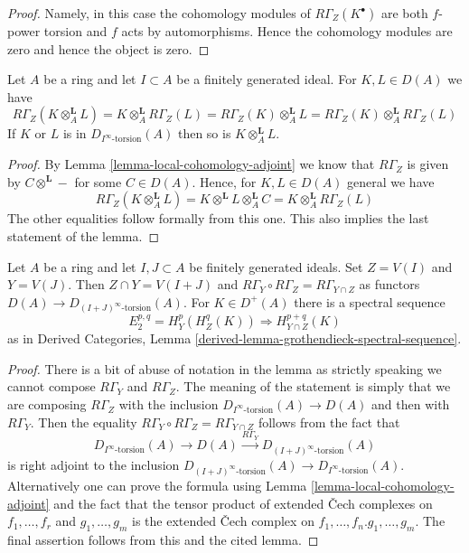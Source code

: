 \begin{proof}
Namely, in this case the cohomology modules of $R\Gamma_Z(K^\bullet)$
are both $f$-power torsion and $f$ acts by automorphisms. Hence the
cohomology modules are zero and hence the object is zero.
\end{proof}

\begin{lemma}
\label{lemma-torsion-tensor-product}
Let $A$ be a ring and let $I \subset A$ be a finitely generated ideal.
For $K, L \in D(A)$ we have
$$
R\Gamma_Z(K \otimes_A^\mathbf{L} L) =
K \otimes_A^\mathbf{L} R\Gamma_Z(L) =
R\Gamma_Z(K) \otimes_A^\mathbf{L} L =
R\Gamma_Z(K) \otimes_A^\mathbf{L} R\Gamma_Z(L)
$$
If $K$ or $L$ is in $D_{I^\infty\text{-torsion}}(A)$ then so is
$K \otimes_A^\mathbf{L} L$.
\end{lemma}

\begin{proof}
By Lemma \ref{lemma-local-cohomology-adjoint} we know that
$R\Gamma_Z$ is given by $C \otimes^\mathbf{L} -$ for some $C \in D(A)$.
Hence, for $K, L \in D(A)$ general we have
$$
R\Gamma_Z(K \otimes_A^\mathbf{L} L) =
K \otimes^\mathbf{L} L \otimes_A^\mathbf{L} C =
K \otimes_A^\mathbf{L} R\Gamma_Z(L)
$$
The other equalities follow formally from this one. This also implies
the last statement of the lemma.
\end{proof}

\begin{lemma}
\label{lemma-local-cohomology-ss}
Let $A$ be a ring and let $I, J \subset A$ be finitely generated
ideals. Set $Z = V(I)$ and $Y = V(J)$. Then $Z \cap Y = V(I + J)$
and $R\Gamma_Y \circ R\Gamma_Z = R\Gamma_{Y \cap Z}$ as functors
$D(A) \to D_{(I + J)^\infty\text{-torsion}}(A)$. For $K \in D^+(A)$
there is a spectral sequence
$$
E_2^{p, q} = H^p_Y(H^q_Z(K)) \Rightarrow H^{p + q}_{Y \cap Z}(K)
$$
as in Derived Categories, Lemma
\ref{derived-lemma-grothendieck-spectral-sequence}.
\end{lemma}

\begin{proof}
There is a bit of abuse of notation in the lemma as strictly
speaking we cannot compose $R\Gamma_Y$ and $R\Gamma_Z$. The
meaning of the statement is simply that we are composing
$R\Gamma_Z$ with the inclusion $D_{I^\infty\text{-torsion}}(A) \to D(A)$
and then with $R\Gamma_Y$. Then the equality
$R\Gamma_Y \circ R\Gamma_Z = R\Gamma_{Y \cap Z}$
follows from the fact that
$$
D_{I^\infty\text{-torsion}}(A) \to D(A) \xrightarrow{R\Gamma_Y}
D_{(I + J)^\infty\text{-torsion}}(A)
$$
is right adjoint to the inclusion
$D_{(I + J)^\infty\text{-torsion}}(A) \to D_{I^\infty\text{-torsion}}(A)$.
Alternatively one can prove the formula using
Lemma \ref{lemma-local-cohomology-adjoint}
and the fact that the tensor product of
extended {\v C}ech complexes on $f_1, \ldots, f_r$ and
$g_1, \ldots, g_m$ is the extended {\v C}ech complex on
$f_1, \ldots, f_n. g_1, \ldots, g_m$.
The final assertion follows from this and the cited lemma.
\end{proof}

